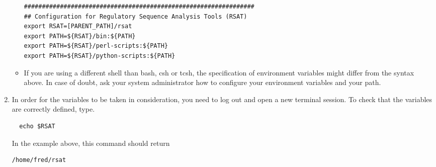 \begin{enumerate}
\begin{itemize}
\begin{lstlisting}
################################################################
## Configuration for Regulatory Sequence Analysis Tools (RSAT)
export RSAT=[PARENT_PATH]/rsat
export PATH=${RSAT}/bin:${PATH}
export PATH=${RSAT}/perl-scripts:${PATH}
export PATH=${RSAT}/python-scripts:${PATH}
\end{lstlisting}

\item If you are using a different shell than bash, csh or tcsh, the
specification of environment variables might differ from the syntax
above.  In case of doubt, ask your system administrator how to
configure your environment variables and your path.

\end{itemize}

\item In order for the variables to be taken in consideration, you
  need to log out and open a new terminal session. To check that the
  variables are correctly defined, type.

\begin{lstlisting}
  echo $RSAT
\end{lstlisting}

In the example above, this command should return

\begin{lstlisting}
/home/fred/rsat
\end{lstlisting}


\end{enumerate}

